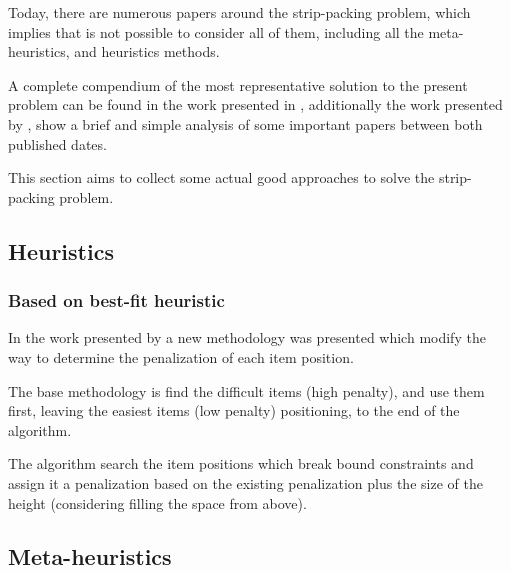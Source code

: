 Today, there are numerous papers around the
strip-packing problem, which implies that is not possible
to consider all of them, including all the meta-heuristics,
and heuristics methods.

A complete compendium of the most representative
solution to the present problem can be found in the work
presented in \cite{hooper},
additionally the work presented by \cite{riff},
show a brief and simple analysis of some important
papers between both published dates.

This section aims to collect some actual good approaches
to solve the strip-packing problem.

\subsection{Heuristics}

\subsubsection{Based on best-fit heuristic}

In the work presented by \cite{burke}
a new methodology was presented which modify the
way to determine the penalization of each item position.

The base methodology is find the difficult items (high penalty),
and use them first, leaving the easiest items (low penalty)
positioning, to the end of the algorithm.

The algorithm search the item positions which break bound
constraints and assign it a penalization based on the existing
penalization plus the size of the height (considering filling the space
from above).

%
%

\subsection{Meta-heuristics}

